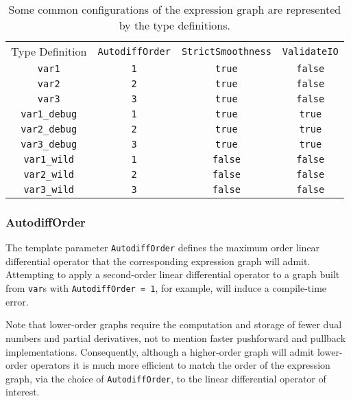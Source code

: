 \begin{table*}[t!]
	\centering
	\renewcommand{\arraystretch}{2}
	\begin{tabular}{cccc}
	\rowcolor[gray]{0.9} Type Definition & \verb|AutodiffOrder|
	& \verb|StrictSmoothness| & \verb|ValidateIO| \\
	\verb|var1| & \verb|1| & \verb|true| & \verb|false| \\
	\rowcolor[gray]{0.9} \verb|var2| & \verb|2| & \verb|true| & \verb|false| \\
	\verb|var3| & \verb|3| & \verb|true| & \verb|false| \\
	\rowcolor[gray]{0.9} \verb|var1_debug| & \verb|1| & \verb|true| & \verb|true| \\
	\verb|var2_debug| & \verb|2| & \verb|true| & \verb|true| \\
	\rowcolor[gray]{0.9} \verb|var3_debug| & \verb|3| & \verb|true| & \verb|true| \\
	\verb|var1_wild| & \verb|1| & \verb|false| & \verb|false| \\
	\rowcolor[gray]{0.9} \verb|var2_wild| & \verb|2| & \verb|false| & \verb|false| \\
	\verb|var3_wild| & \verb|3| & \verb|false| & \verb|false| \\
	\end{tabular}
	\label{tab:typedefs}
	\caption{Some common configurations of the expression graph are represented
	by the \nomad type definitions.}
\end{table*}

\subsubsection{AutodiffOrder}

The template parameter \verb|AutodiffOrder| defines the maximum order
linear differential operator that the corresponding expression graph will
admit.  Attempting to apply a second-order linear differential operator
to a graph built from \verb|var|s with \verb|AutodiffOrder = 1|, for example,
will induce a compile-time error.

Note that lower-order graphs require the computation and storage of
fewer dual numbers and partial derivatives, not to mention faster pushforward
and pullback implementations.  Consequently, although a higher-order
graph will admit lower-order operators it is much more efficient to match
the order of the expression graph, via the choice of \verb|AutodiffOrder|,
to the linear differential operator of interest.

